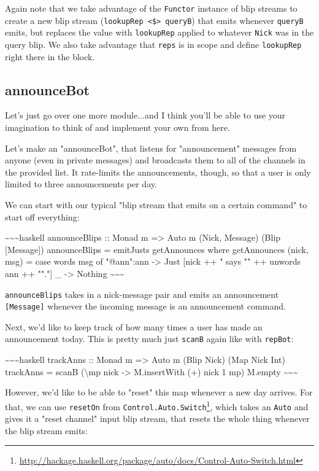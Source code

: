 \documentclass[]{article}
\renewcommand{\href}[2]{#2\footnote{\url{#1}}}
\begin{document}
Again note that we take advantage of the \texttt{Functor} instance of blip
streams to create a new blip stream
(\texttt{lookupRep\ \textless{}\$\textgreater{}\ queryB}) that emits whenever
\texttt{queryB} emits, but replaces the value with \texttt{lookupRep} applied to
whatever \texttt{Nick} was in the query blip. We also take advantage that
\texttt{reps} is in scope and define \texttt{lookupRep} right there in the
block.

\subsection{announceBot}

Let's just go over one more module...and I think you'll be able to use your
imagination to think of and implement your own from here.

Let's make an "announceBot", that listens for "announcement" messages from
anyone (even in private messages) and broadcasts them to all of the channels in
the provided list. It rate-limits the announcements, though, so that a user is
only limited to three announcements per day.

We can start with our typical "blip stream that emits on a certain command" to
start off everything:

\textasciitilde{}\textasciitilde{}\textasciitilde{}haskell announceBlips ::
Monad m =\textgreater{} Auto m (Nick, Message) (Blip {[}Message{]})
announceBlips = emitJusts getAnnounces where getAnnounces (nick, msg) = case
words msg of "@ann":ann -\textgreater{} Just {[}nick ++ " says "" ++ unwords ann
++ ""."{]} \_ -\textgreater{} Nothing
\textasciitilde{}\textasciitilde{}\textasciitilde{}

\texttt{announceBlips} takes in a nick-message pair and emits an announcement
\texttt{{[}Message{]}} whenever the incoming message is an announcement command.

Next, we'd like to keep track of how many times a user has made an announcement
today. This is pretty much just \texttt{scanB} again like with \texttt{repBot}:

\textasciitilde{}\textasciitilde{}\textasciitilde{}haskell trackAnns :: Monad m
=\textgreater{} Auto m (Blip Nick) (Map Nick Int) trackAnns = scanB
(\textbackslash{}mp nick -\textgreater{} M.insertWith (+) nick 1 mp) M.empty
\textasciitilde{}\textasciitilde{}\textasciitilde{}

However, we'd like to be able to "reset" this map whenever a new day arrives.
For that, we can use \texttt{resetOn} from
\href{http://hackage.haskell.org/package/auto/docs/Control-Auto-Switch.html}{\texttt{Control.Auto.Switch}},
which takes an \texttt{Auto} and gives it a "reset channel" input blip stream,
that resets the whole thing whenever the blip stream emits:
\end{document}

